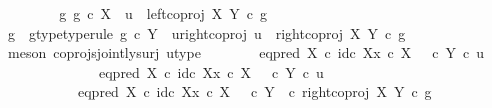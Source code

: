 \begin{isabellebody}
\ \ \isamarkupfalse%
\isanewline
\ \ \ \ \isamarkupfalse%
\ {\isachardoublequoteopen}{\isasymforall}g{\isachardot}{\kern0pt}\ g\ {\isasymin}\isactrlsub c\ X\ {\isasymlongrightarrow}\ u\ {\isasymnoteq}\ left{\isacharunderscore}{\kern0pt}coproj\ X\ Y\ {\isasymcirc}\isactrlsub c\ g{\isachardoublequoteclose}\isanewline
\ \ \ \ \isamarkupfalse%
\ \isamarkupfalse%
\ g\ \ g{\isacharunderscore}{\kern0pt}type{\isacharbrackleft}{\kern0pt}type{\isacharunderscore}{\kern0pt}rule{\isacharbrackright}{\kern0pt}{\isacharcolon}{\kern0pt}\ {\isachardoublequoteopen}g\ {\isasymin}\isactrlsub c\ Y{\isachardoublequoteclose}\ \ u{\isacharunderscore}{\kern0pt}right{\isacharunderscore}{\kern0pt}coproj{\isacharcolon}{\kern0pt}\ {\isachardoublequoteopen}u\ {\isacharequal}{\kern0pt}\ right{\isacharunderscore}{\kern0pt}coproj\ X\ Y\ {\isasymcirc}\isactrlsub c\ g{\isachardoublequoteclose}\isanewline
\ \ \ \ \ \ \isamarkupfalse%
\ {\isacharparenleft}{\kern0pt}meson\ coprojs{\isacharunderscore}{\kern0pt}jointly{\isacharunderscore}{\kern0pt}surj\ u{\isacharunderscore}{\kern0pt}type{\isacharparenright}{\kern0pt}\isanewline
\isanewline
\ \ \ \ \isamarkupfalse%
\ {\isachardoublequoteopen}{\isasymf}\ {\isacharequal}{\kern0pt}\ {\isacharparenleft}{\kern0pt}eq{\isacharunderscore}{\kern0pt}pred\ X\ {\isasymcirc}\isactrlsub c\ {\isasymlangle}id\isactrlsub c\ X{\isacharcomma}{\kern0pt}x\ {\isasymcirc}\isactrlsub c\ {\isasymbeta}\isactrlbsub X\isactrlesub {\isasymrangle}{\isacharparenright}{\kern0pt}\ {\isasymamalg}\ {\isacharparenleft}{\kern0pt}{\isasymf}\ {\isasymcirc}\isactrlsub c\ {\isasymbeta}\isactrlbsub Y\isactrlesub {\isacharparenright}{\kern0pt}\ {\isasymcirc}\isactrlsub c\ u{\isachardoublequoteclose}\ \ \isanewline
\ \ \ \ \isamarkupfalse%
\ {\isacharminus}{\kern0pt}\isanewline
\ \ \ \ \ \ \isamarkupfalse%
\ {\isachardoublequoteopen}{\isacharparenleft}{\kern0pt}eq{\isacharunderscore}{\kern0pt}pred\ X\ {\isasymcirc}\isactrlsub c\ {\isasymlangle}id\isactrlsub c\ X{\isacharcomma}{\kern0pt}x\ {\isasymcirc}\isactrlsub c\ {\isasymbeta}\isactrlbsub X\isactrlesub {\isasymrangle}{\isacharparenright}{\kern0pt}\ {\isasymamalg}\ {\isacharparenleft}{\kern0pt}{\isasymf}\ {\isasymcirc}\isactrlsub c\ {\isasymbeta}\isactrlbsub Y\isactrlesub {\isacharparenright}{\kern0pt}\ {\isasymcirc}\isactrlsub c\ u\isanewline
\ \ \ \ \ \ \ \ \ \ {\isacharequal}{\kern0pt}\ {\isacharparenleft}{\kern0pt}eq{\isacharunderscore}{\kern0pt}pred\ X\ {\isasymcirc}\isactrlsub c\ {\isasymlangle}id\isactrlsub c\ X{\isacharcomma}{\kern0pt}x\ {\isasymcirc}\isactrlsub c\ {\isasymbeta}\isactrlbsub X\isactrlesub {\isasymrangle}{\isacharparenright}{\kern0pt}\ {\isasymamalg}\ {\isacharparenleft}{\kern0pt}{\isasymf}\ {\isasymcirc}\isactrlsub c\ {\isasymbeta}\isactrlbsub Y\isactrlesub {\isacharparenright}{\kern0pt}\ \ {\isasymcirc}\isactrlsub c\ right{\isacharunderscore}{\kern0pt}coproj\ X\ Y\ {\isasymcirc}\isactrlsub c\ g{\isachardoublequoteclose}\isanewline

\end{isabellebody}

